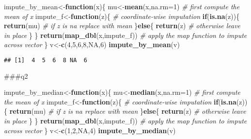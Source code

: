 \documentclass[
]{article}
\newenvironment{Shaded}{\begin{snugshade}}{\end{snugshade}}
\newcommand{\AttributeTok}[1]{\textcolor[rgb]{0.13,0.29,0.53}{#1}}
\newcommand{\CommentTok}[1]{\textcolor[rgb]{0.56,0.35,0.01}{\textit{#1}}}
\newcommand{\ConstantTok}[1]{\textcolor[rgb]{0.56,0.35,0.01}{#1}}
\newcommand{\ControlFlowTok}[1]{\textcolor[rgb]{0.13,0.29,0.53}{\textbf{#1}}}
\newcommand{\DecValTok}[1]{\textcolor[rgb]{0.00,0.00,0.81}{#1}}
\newcommand{\FunctionTok}[1]{\textcolor[rgb]{0.13,0.29,0.53}{\textbf{#1}}}
\newcommand{\NormalTok}[1]{#1}
\newcommand{\OtherTok}[1]{\textcolor[rgb]{0.56,0.35,0.01}{#1}}
\begin{document}
\begin{Shaded}
\begin{Highlighting}[]
\NormalTok{impute\_by\_mean}\OtherTok{\textless{}{-}}\ControlFlowTok{function}\NormalTok{(x)\{}
\NormalTok{  mu}\OtherTok{\textless{}{-}}\FunctionTok{mean}\NormalTok{(x,}\AttributeTok{na.rm=}\DecValTok{1}\NormalTok{) }\CommentTok{\# first compute the mean of x }
\NormalTok{  impute\_f}\OtherTok{\textless{}{-}}\ControlFlowTok{function}\NormalTok{(z)\{ }\CommentTok{\# coordinate{-}wise imputation}
  \ControlFlowTok{if}\NormalTok{(}\FunctionTok{is.na}\NormalTok{(z))\{}
    \FunctionTok{return}\NormalTok{(mu) }\CommentTok{\# if z is na replace with mean }
\NormalTok{    \}}\ControlFlowTok{else}\NormalTok{\{}
      \FunctionTok{return}\NormalTok{(z) }\CommentTok{\# otherwise leave in place }
\NormalTok{    \}}
\NormalTok{  \}}
\FunctionTok{return}\NormalTok{(}\FunctionTok{map\_dbl}\NormalTok{(x,impute\_f)) }\CommentTok{\# apply the map function to impute across vector}
\NormalTok{\}}
\NormalTok{v}\OtherTok{\textless{}{-}}\FunctionTok{c}\NormalTok{(}\DecValTok{4}\NormalTok{,}\DecValTok{5}\NormalTok{,}\DecValTok{6}\NormalTok{,}\DecValTok{8}\NormalTok{,}\ConstantTok{NA}\NormalTok{,}\DecValTok{6}\NormalTok{)}
\FunctionTok{impute\_by\_mean}\NormalTok{(v)}
\end{Highlighting}
\end{Shaded}

\begin{verbatim}
## [1]  4  5  6  8 NA  6
\end{verbatim}

\#\#\#q2

\begin{Shaded}
\begin{Highlighting}[]
\NormalTok{impute\_by\_median}\OtherTok{\textless{}{-}}\ControlFlowTok{function}\NormalTok{(x)\{}
\NormalTok{  mu}\OtherTok{\textless{}{-}}\FunctionTok{median}\NormalTok{(x,}\AttributeTok{na.rm=}\DecValTok{1}\NormalTok{) }\CommentTok{\# first compute the mean of x }
\NormalTok{  impute\_f}\OtherTok{\textless{}{-}}\ControlFlowTok{function}\NormalTok{(z)\{ }\CommentTok{\# coordinate{-}wise imputation}
  \ControlFlowTok{if}\NormalTok{(}\FunctionTok{is.na}\NormalTok{(z))\{}
    \FunctionTok{return}\NormalTok{(mu) }\CommentTok{\# if z is na replace with mean }
\NormalTok{    \}}\ControlFlowTok{else}\NormalTok{\{}
      \FunctionTok{return}\NormalTok{(z) }\CommentTok{\# otherwise leave in place }
\NormalTok{    \}}
\NormalTok{  \}}
\FunctionTok{return}\NormalTok{(}\FunctionTok{map\_dbl}\NormalTok{(x,impute\_f)) }\CommentTok{\# apply the map function to impute across vector}
\NormalTok{\}}
\NormalTok{v}\OtherTok{\textless{}{-}}\FunctionTok{c}\NormalTok{(}\DecValTok{1}\NormalTok{,}\DecValTok{2}\NormalTok{,}\ConstantTok{NA}\NormalTok{,}\DecValTok{4}\NormalTok{)}
\FunctionTok{impute\_by\_median}\NormalTok{(v)}
\end{Highlighting}
\end{Shaded}
\end{document}
